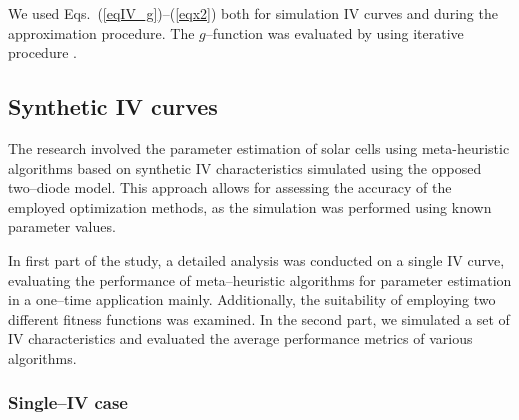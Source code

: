 \documentclass[a4paper,fleqn]{cas-sc}
\begin{document}
We used Eqs.~(\ref{eqIV_g})--(\ref{eqx2}) both for simulation IV curves and during the approximation procedure.
The $g$--function was evaluated by using iterative procedure \cite{roberts2015calculating}.

\subsection{Synthetic IV curves}\label{SynIV}
The research involved the parameter estimation of solar cells using meta-heuristic algorithms based
on synthetic IV characteristics simulated using the opposed two--diode model.
This approach allows for assessing the accuracy of the employed optimization methods,
as the simulation was performed using known parameter values.

In first part of the study, a detailed analysis was conducted on a single IV curve,
evaluating the performance of meta--heuristic algorithms for parameter estimation in a one--time application mainly.
Additionally, the suitability of employing two different fitness functions was examined.
In the second part, we simulated a set of IV characteristics and evaluated the average performance metrics of various algorithms.

\subsubsection{Single--IV case}\label{SingleIV}
\end{document}
